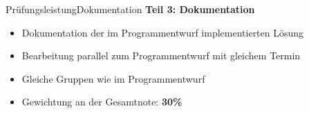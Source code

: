 \begin{frame}{Prüfungsleistung}{Dokumentation}
	\textbf{Teil 3: Dokumentation}
	\begin{itemize}
		\item Dokumentation der im Programmentwurf implementierten Lösung
		\item Bearbeitung parallel zum Programmentwurf mit gleichem Termin
		\item Gleiche Gruppen wie im Programmentwurf
		\item Gewichtung an der Gesamtnote: \textbf{30\%}
	\end{itemize}
\end{frame}